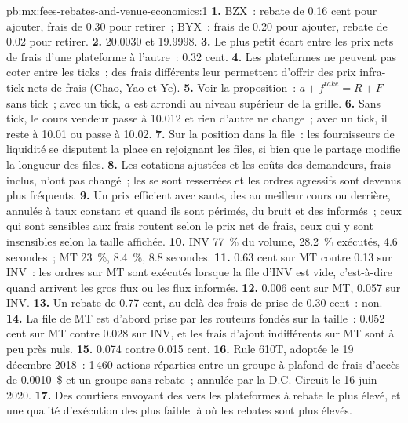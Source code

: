 \begin{solution}{pb:mx:fees-rebates-and-venue-economics:1}
\textbf{1.} BZX~: rebate de 0.16 cent pour ajouter, frais de 0.30 pour retirer~; BYX~: frais de 0.20 pour ajouter, rebate de 0.02 pour retirer.
\textbf{2.} 20.0030 et 19.9998.
\textbf{3.} Le plus petit écart entre les prix nets de frais d'une plateforme à l'autre~: 0.32 cent.
\textbf{4.} Les plateformes ne peuvent pas coter entre les ticks~; des frais différents leur permettent d'offrir des prix infra-tick nets de frais (Chao, Yao et Ye).
\textbf{5.} Voir la proposition~: $a+f^{take}=R+F$ sans tick~; avec un tick, $a$ est arrondi au niveau supérieur de la grille.
\textbf{6.} Sans tick, le cours vendeur passe à 10.012 et rien d'autre ne change~; avec un tick, il reste à 10.01 ou passe à 10.02.
\textbf{7.} Sur la position dans la file~: les fournisseurs de liquidité se disputent la place en rejoignant les files, si bien que le partage modifie la longueur des files.
\textbf{8.} Les cotations ajustées et les coûts des demandeurs, frais inclus, n'ont pas changé~; les  se sont resserrées et les ordres agressifs sont devenus plus fréquents.
\textbf{9.} Un prix efficient avec sauts, des  au meilleur cours ou derrière, annulés à taux constant et quand ils sont périmés, du bruit et des  informés~;
ceux qui sont sensibles aux frais routent selon le prix net de frais, ceux qui y sont insensibles selon la taille affichée.
\textbf{10.} INV 77~\% du volume, 28.2~\% exécutés, 4.6 secondes~; MT 23~\%, 8.4~\%, 8.8 secondes.
\textbf{11.} 0.63 cent sur MT contre 0.13 sur INV~: les ordres sur MT sont exécutés lorsque la file d'INV est vide, c'est-à-dire quand arrivent les gros flux ou les flux informés.
\textbf{12.} 0.006 cent sur MT, 0.057 sur INV.
\textbf{13.} Un rebate de 0.77 cent, au-delà des frais de prise de 0.30 cent~: non.
\textbf{14.} La file de MT est d'abord prise par les routeurs fondés sur la taille~: 0.052 cent sur MT contre 0.028 sur INV, et les frais d'ajout indifférents sur MT sont à peu près nuls.
\textbf{15.} 0.074 contre 0.015 cent.
\textbf{16.} Rule 610T, adoptée le 19 décembre 2018~: 1\,460 actions réparties entre un groupe à plafond de frais d'accès de 0.0010~\$ et un groupe sans rebate~; annulée par la D.C. Circuit le
16 juin 2020.
\textbf{17.} Des courtiers envoyant des  vers les plateformes à rebate le plus élevé, et une qualité d'exécution des  plus faible là où les rebates sont plus élevés.

\end{solution}
